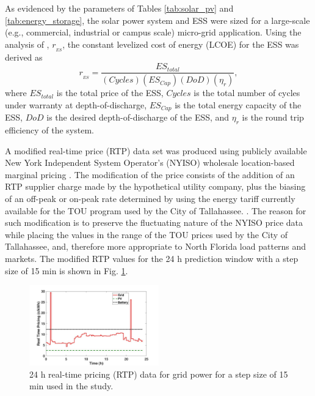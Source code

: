 As evidenced by the parameters of Tables \ref{tab:solar_pv} and \ref{tab:energy_storage}, the solar power system and ESS were sized for a large-scale (e.g., commercial, industrial or campus scale) micro-grid application. Using the analysis of \cite{res}, $r_{_{ES}}$, the constant levelized cost of energy (LCOE) for the ESS was derived as
\begin{equation}
r_{_{ES}} = \dfrac{ES_{total}}{(Cycles) (ES_{Cap}) (DoD) (\eta_{r})},
\end{equation}
where $ES_{total}$ is the total price of the ESS, $Cycles$ is the total number of cycles under warranty at depth-of-discharge, $ES_{Cap}$ is the total energy capacity of the ESS, $DoD$ is the desired depth-of-discharge of the ESS, and $\eta_{r}$ is the round trip efficiency of the system.


A modified real-time price (RTP) data set was produced using publicly available New York Independent System Operator's (NYISO) wholesale location-based marginal pricing \cite{NYISO2017}. The modification of the price consists of the addition of an RTP supplier charge made by the hypothetical utility company, plus the biasing of an off-peak or on-peak rate determined by using the energy tariff currently available for the TOU program used by the City of Tallahassee. \cite{tallahassee}. The reason for such modification is to preserve the fluctuating nature of the NYISO price data while placing the values in the range of the TOU prices used by the City of Tallahassee, and, therefore more appropriate to North Florida load patterns and markets. The modified RTP values for the 24 h prediction window with a step size of 15 min is shown in Fig. \ref{fig:rtp_24hr}.


\begin{figure}[!htbp]
\vspace{-5mm}
\centering
\includegraphics[width=0.5\textwidth]{figs/RTP_24hr_with_der.jpg}
\caption{24 h real-time pricing (RTP) data for grid power for a step size of 15 min used in the study.}
\label{fig:rtp_24hr}
\vspace{-5mm}
\end{figure}

